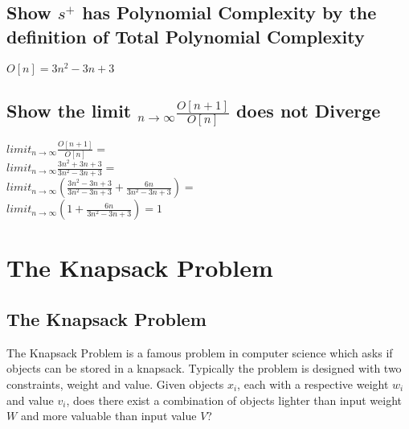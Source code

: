 \documentclass[11pt]{article}
\begin{document}
\subsection{Show $s^+$ has Polynomial Complexity by the definition of Total Polynomial Complexity}
\begin{center}
\vspace{2mm}
$
O[n] = 3n^2 -3n + 3
$
\end{center}

\subsection{Show the limit $_{n \rightarrow \infty}\frac{O[n+1]}{O[n]}$ does not Diverge}
\begin{center}
$
limit_{n \rightarrow \infty}\frac{O[n+1]}{O[n]} =
$
\\ \vspace{2mm}
$
limit_{n \rightarrow \infty}\frac{3n^2 + 3n + 3}{3n^2 - 3n + 3} =
$
\\ \vspace{2mm}
$
limit_{n \rightarrow \infty}(\frac{3n^2 - 3n + 3}{3n^2 - 3n + 3} + \frac{6n}{3n^2 - 3n + 3}) =
$
\\ \vspace{2mm}
$
limit_{n \rightarrow \infty}(1 + \frac{6n }{3n^2 - 3n + 3}) = 1
$
\end{center}





\newpage
\section{The Knapsack Problem}



\subsection{The Knapsack Problem}
The Knapsack Problem is a famous problem in computer science which asks if objects can be stored in a knapsack. Typically the problem is designed
with two constraints, weight and value. Given objects $x_i$, each with a respective weight $w_i$ and value $v_i$, does there exist a combination of
objects lighter than input weight $W$ and more valuable than input value $V$?
\end{document}
